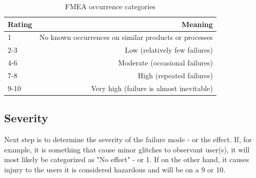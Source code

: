 \documentclass[10pt,oneside]{book}                  %
\begin{document}
\begin{table}[h]
\centering
    \begin{tabular}{ | l | r | }
    \hline
    Rating & Meaning \\ \hline \hline
    1      & No known occurrences on similar products or processes  \\ \hline
    2-3    & Low (relatively few failures) \\ \hline
    4-6    & Moderate (occasional failures) \\ \hline
    7-8    & High (repeated failures) \\ \hline
    9-10   & Very high (failure is almost inevitable) \\ \hline
    \end{tabular}
\caption{FMEA occurrence categories}
\label{table:fmea_occurrence}
\end{table}

\subsection{Severity}
\label{sec:fmea_severity}
Next step is to determine the severity of the failure mode - or the effect. If, for example, it is something that cause minor glitches to observant user(s), it will most likely be categorized as "No effect" - or 1.
If on the other hand, it causes injury to the users it is considered hazardous and will be on a 9 or 10.
\end{document}
